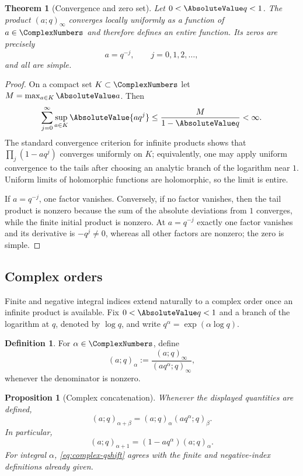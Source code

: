 \documentclass[11pt,a4paper,oneside,openany]{book}
\newtheorem{theorem}{Theorem}[chapter]
\newtheorem{proposition}[proposition]{Proposition}
\theoremstyle{definition}
\newtheorem{definition}[definition]{Definition}
\theoremstyle{remark}
\begin{document}
\begin{theorem}[Convergence and zero set]\label{thm:poch-entire}
Let $0<\AbsoluteValue q<1$.  The product $(a;q)_\infty$ converges locally uniformly as a function of $a\in\ComplexNumbers$ and therefore defines an entire function.  Its zeros are precisely
\[
 a=q^{-j},\qquad j=0,1,2,\ldots,
\]
and all are simple.
\end{theorem}

\begin{proof}
On a compact set $K\subset\ComplexNumbers$ let $M=\max_{a\in K}\AbsoluteValue a$.  Then
\[
 \sum_{j=0}^{\infty}\sup_{a\in K}\AbsoluteValue{a q^j}
 \le \frac{M}{1-\AbsoluteValue q}<\infty.
\]
The standard convergence criterion for infinite products shows that
\(
 \prod_j(1-aq^j)
\)
converges uniformly on $K$; equivalently, one may apply uniform convergence to the tails after choosing an analytic branch of the logarithm near $1$.  Uniform limits of holomorphic functions are holomorphic, so the limit is entire.

If $a=q^{-j}$, one factor vanishes.  Conversely, if no factor vanishes, then the tail product is nonzero because the sum of the absolute deviations from $1$ converges, while the finite initial product is nonzero.  At $a=q^{-j}$ exactly one factor vanishes and its derivative is $-q^j\ne0$, whereas all other factors are nonzero; the zero is simple.
\end{proof}

\subsection{Complex orders}

Finite and negative integral indices extend naturally to a complex order once an infinite product is available.  Fix $0<\AbsoluteValue q<1$ and a branch of the logarithm at $q$, denoted by $\log q$, and write $q^\alpha=\exp(\alpha\log q)$.

\begin{definition}\label{def:complex-qshift}
For $\alpha\in\ComplexNumbers$, define
\[
 (a;q)_\alpha
 :=\frac{(a;q)_\infty}{(aq^\alpha;q)_\infty},
 \tag{1.1}\label{eq:complex-qshift}
\]
whenever the denominator is nonzero.
\end{definition}

\begin{proposition}[Complex concatenation]\label{prop:complex-concat}
Whenever the displayed quantities are defined,
\[
 (a;q)_{\alpha+\beta}
 =(a;q)_\alpha(aq^\alpha;q)_\beta.
 \tag{1.2}\label{eq:complex-concat}
\]
In particular,
\[
 (a;q)_{\alpha+1}=(1-aq^\alpha)(a;q)_\alpha.
 \tag{1.3}\label{eq:complex-shift}
\]
For integral $\alpha$, \eqref{eq:complex-qshift} agrees with the finite and negative-index definitions already given.
\end{proposition}
\end{document}
